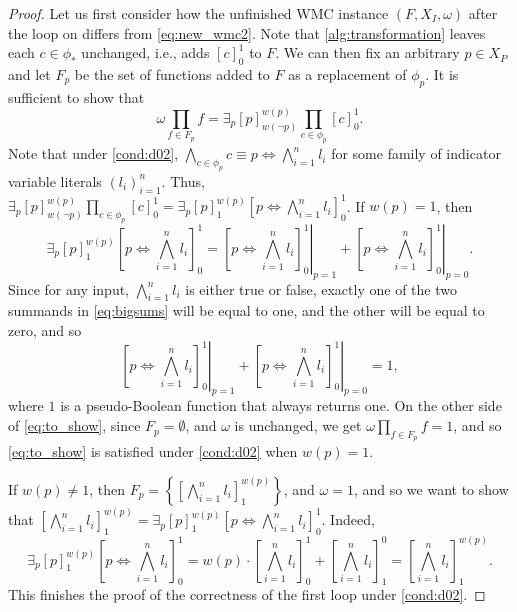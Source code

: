 \begin{proof}
  Let us first consider how the unfinished WMC instance $(F, X_I, \omega)$ after
  the loop on  differs from
  \eqref{eq:new_wmc2}. Note that \cref{alg:transformation} leaves each $c \in
  \phi_*$ unchanged, i.e., adds $[c]_0^1$ to $F$. We can then fix an arbitrary
  $p \in X_P$ and let $F_p$ be the set of functions added to $F$ as a
  replacement of $\phi_p$. It is sufficient to show that
  \begin{equation} \label{eq:to_show}
    \omega \prod_{f \in F_p} f = \exists_p [p]_{w(\neg p)}^{w(p)} \prod_{c \in \phi_p} [c]_0^1.
  \end{equation}
  Note that under \cref{cond:d02}, $\bigwedge_{c \in \phi_p} c \equiv p
  \Leftrightarrow \bigwedge_{i=1}^n l_i$ for some family of indicator variable
  literals $(l_i)_{i=1}^n$. Thus, $\exists_p [p]_{w(\neg p)}^{w(p)} \prod_{c \in
    \phi_p} [c]_0^1 = \exists_p [p]_1^{w(p)} \left[ p \Leftrightarrow
    \bigwedge_{i=1}^n l_i \right]_0^1$. If $w(p) = 1$, then
  \begin{equation} \label{eq:bigsums}
    \exists_p [p]_1^{w(p)} \left[ p \Leftrightarrow \bigwedge_{i=1}^n l_i \right]_0^1 = \left.\left[ p \Leftrightarrow \bigwedge_{i=1}^n l_i \right]_0^1\right|_{p=1} + \left.\left[ p \Leftrightarrow \bigwedge_{i=1}^n l_i \right]_0^1\right|_{p=0}.
  \end{equation}
  Since for any input, $\bigwedge_{i=1}^n l_i$ is either true or false, exactly
  one of the two summands in \cref{eq:bigsums} will be equal to one, and the
  other will be equal to zero, and so
  \[
  \left.\left[ p \Leftrightarrow \bigwedge_{i=1}^n l_i \right]_0^1\right|_{p=1} + \left.\left[ p \Leftrightarrow \bigwedge_{i=1}^n l_i \right]_0^1\right|_{p=0} = 1,
  \]
  where $1$ is a pseudo-Boolean function that always returns one. On the other side of \cref{eq:to_show}, since $F_p = \emptyset$, and $\omega$ is unchanged, we get $\omega\prod_{f \in F_p} f = 1$, and so \cref{eq:to_show} is satisfied under \cref{cond:d02} when $w(p) = 1$.

  If $w(p) \ne 1$, then $F_p = \left\{ \left[ \bigwedge_{i = 1}^n l_i
    \right]_1^{w(p)} \right\}$, and $\omega = 1$, and so we want to show that
  $\left[ \bigwedge_{i = 1}^n l_i \right]_1^{w(p)} = \exists_p [p]_1^{w(p)}
  \left[ p \Leftrightarrow \bigwedge_{i=1}^n l_i \right]_0^1$. Indeed,
  \[
  \exists_p [p]_1^{w(p)} \left[ p \Leftrightarrow \bigwedge_{i=1}^n l_i \right]_0^1 = w(p) \cdot \left[ \bigwedge_{i=1}^n l_i \right]_0^1 + \left[\bigwedge_{i=1}^n l_i \right]_1^0 = \left[ \bigwedge_{i=1}^n l_i \right]_1^{w(p)}.
  \]
  This finishes the proof of the correctness of the first loop under \cref{cond:d02}.


\end{proof}
